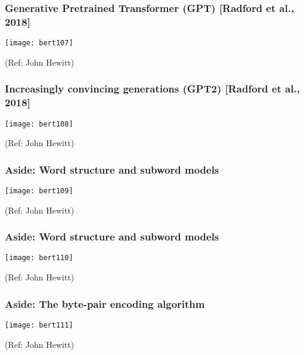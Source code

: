 \begin{frame}[fragile]\frametitle{Generative Pretrained Transformer (GPT) [Radford et al., 2018]}

			\begin{center}
			\texttt{[image: bert107]}
			\end{center}		
			
			{\tiny (Ref: John Hewitt)}

\end{frame}

\begin{frame}[fragile]\frametitle{Increasingly convincing generations (GPT2) [Radford et al., 2018]}

			\begin{center}
			\texttt{[image: bert108]}
			\end{center}		
			
			{\tiny (Ref: John Hewitt)}

\end{frame}


\begin{frame}[fragile]\frametitle{Aside: Word structure and subword models}

			\begin{center}
			\texttt{[image: bert109]}
			\end{center}		
			
			{\tiny (Ref: John Hewitt)}

\end{frame}

\begin{frame}[fragile]\frametitle{Aside: Word structure and subword models}

			\begin{center}
			\texttt{[image: bert110]}
			\end{center}		
			
			{\tiny (Ref: John Hewitt)}

\end{frame}


\begin{frame}[fragile]\frametitle{Aside: The byte-pair encoding algorithm}

			\begin{center}
			\texttt{[image: bert111]}
			\end{center}		
			
			{\tiny (Ref: John Hewitt)}

\end{frame}

